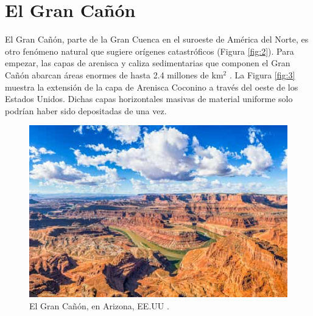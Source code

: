 \documentclass[10pt,twocolumn,letterpaper]{article}
\begin{document}
\section{El Gran Cañón}

El Gran Cañón, parte de la Gran Cuenca en el suroeste de América del Norte, es otro fenómeno natural que sugiere orígenes catastróficos (Figura \ref{fig:2}). Para empezar, las capas de arenisca y caliza sedimentarias que componen el Gran Cañón abarcan áreas enormes de hasta 2.4 millones de km$^2$ \cite{21}. La Figura \ref{fig:3} muestra la extensión de la capa de Arenisca Coconino a través del oeste de los Estados Unidos. Dichas capas horizontales masivas de material uniforme solo podrían haber sido depositadas de una vez.

\begin{figure}[t]
\begin{center}
   \includegraphics[width=1\linewidth]{grand-canyon.jpg}
\end{center}
   \caption{El Gran Cañón, en Arizona, EE.UU \cite{49}.}
\label{fig:2}
\label{fig:onecol}
\end{figure}
\end{document}
